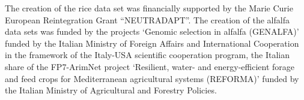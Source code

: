\begin{acknowledgements}
The creation of the rice data set was financially supported by the Marie Curie European
Reintegration Grant ``NEUTRADAPT''.
The creation of the alfalfa data sets was funded by the projects ‘Genomic selection in alfalfa (GENALFA)’ funded by the Italian Ministry of Foreign Affairs and International Cooperation in the framework of the Italy-USA scientific cooperation program, the Italian share of the FP7-ArimNet project ‘Resilient, water- and energy-efficient forage and feed crops for Mediterranean agricultural systems (REFORMA)’ funded by the Italian Ministry of Agricultural and Forestry Policies.
\end{acknowledgements}


